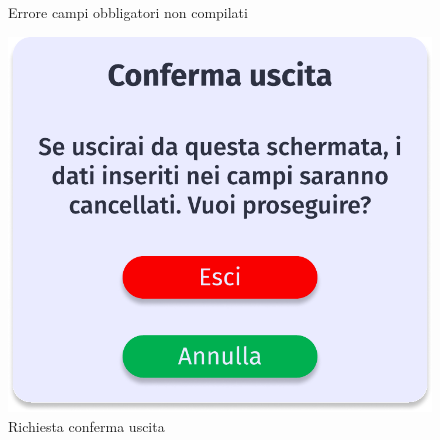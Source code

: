 \begin{figure}[!htb]
\begin{minipage}{0.32\textwidth}
                \caption{Errore campi obbligatori non compilati}
            \end{minipage}\hfill
            \begin{minipage}{0.32\textwidth}
                \centering
                \includegraphics[width=.7\linewidth]{Immagini/Frames/Popup/P6.pdf}
                \caption{Richiesta conferma uscita}
            \end{minipage}\hfill
        \end{figure}

        \clearpage
        
